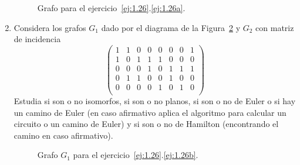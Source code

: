 \begin{ejercicio}
\begin{enumerate}
\begin{figure}
            \caption{Grafo para el ejercicio~\ref{ej:1.26}.\ref{ej:1.26a}.}
            \label{fig:1.26_a}
        \end{figure}
        
        \item\label{ej:1.26b}
        Considera los grafos $G_1$ dado por el diagrama de la Figura~\ref{fig:1.26_1} y $G_2$ con matriz de incidencia
        \[
            \begin{pmatrix}
                1 & 1 & 0 & 0 & 0 & 0 & 0 & 1 \\
                1 & 0 & 1 & 1 & 1 & 0 & 0 & 0 \\
                0 & 0 & 0 & 1 & 0 & 1 & 1 & 1 \\
                0 & 1 & 1 & 0 & 0 & 1 & 0 & 0 \\
                0 & 0 & 0 & 0 & 1 & 0 & 1 & 0 \\
            \end{pmatrix}
        \]
        Estudia si son o no isomorfos, si son o no planos, si son o no de Euler o si hay un camino de Euler (en caso afirmativo aplica el algoritmo para calcular un circuito o un camino de Euler) y si son o no de Hamilton (encontrando el camino en caso afirmativo).
        \begin{figure}
            \centering
            \caption{Grafo $G_1$ para el ejercicio~\ref{ej:1.26}.\ref{ej:1.26b}.}
            \label{fig:1.26_1}
        \end{figure}


\end{enumerate}
\end{ejercicio}
